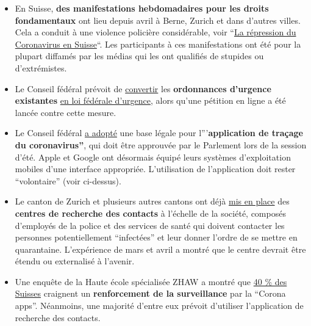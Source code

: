 \begin{itemize}
\tightlist
\item
  En Suisse, \textbf{des manifestations hebdomadaires pour les droits
  fondamentaux} ont lieu depuis avril à Berne, Zurich et dans d'autres
  villes. Cela a conduit à une violence policière considérable, voir
  ``\href{https://swprs.org/corona-repression-in-der-schweiz/}{La
  répression du Coronavirus en Suisse}``. Les participants à ces
  manifestations ont été pour la plupart diffamés par les médias qui les
  ont qualifiés de stupides ou d'extrémistes.
\item
  Le Conseil fédéral prévoit de
  \href{https://www.zeitpunkt.ch/petition-gegen-umwandlung-der-notverordnungen-dringliches-bundesrecht-lanciert}{convertir}
  les \textbf{ordonnances d'urgence existantes}
  \href{https://www.zeitpunkt.ch/petition-gegen-umwandlung-der-notverordnungen-dringliches-bundesrecht-lanciert}{en
  loi fédérale d'urgence,} alors qu'une pétition en ligne a été lancée
  contre cette mesure.
\item
  Le Conseil fédéral
  \href{https://www.republik.ch/2020/05/21/haftstrafe-ohne-straftat-lauber-soll-abgesetzt-werden-und-bald-nicht-mehr-alles-in-butter}{a
  adopté} une base légale pour l'''\textbf{application de traçage du
  coronavirus''}, qui doit être approuvée par le Parlement lors de la
  session d'été. Apple et Google ont désormais équipé leurs systèmes
  d'exploitation mobiles d'une interface appropriée. L'utilisation de
  l'application doit rester ``volontaire'' (voir ci-dessus).
\item
  Le canton de Zurich et plusieurs autres cantons ont déjà
  \href{https://www.nzz.ch/zuerich/coronavirus-in-zuerich-contact-tracing-ist-gut-angelaufen-ld.1556846}{mis
  en place} des \textbf{centres de recherche des contacts} à l'échelle
  de la société, composés d'employés de la police et des services de
  santé qui doivent contacter les personnes potentiellement
  ``infectées'' et leur donner l'ordre de se mettre en quarantaine.
  L'expérience de mars et avril a montré que le centre devrait être
  étendu ou externalisé à l'avenir.
\item
  Une enquête de la Haute école spécialisée ZHAW a montré que
  \href{https://www.zhaw.ch/de/medien/medienmitteilungen/detailansicht-medienmitteilung/event-news/viele-schweizer-fuerchten-ueberwachung-durch-contact-tracing-app/}{40
  \% des Suisses} craignent un \textbf{renforcement de la surveillance}
  par la ``Corona apps''. Néanmoins, une majorité d'entre eux prévoit
  d'utiliser l'application de recherche des contacts.

\end{itemize}
